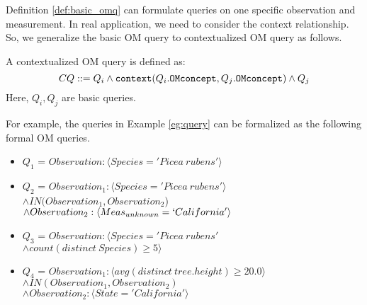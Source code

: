 Definition \ref{def:basic_omq} can formulate queries on
one specific observation and measurement. 
In real application, we need to consider the context relationship. 
So, we generalize the basic OM query to contextualized OM query as
follows. 

\begin{definition}\label{def:context_omq} A
  contextualized OM query is defined as:
\[CQ ::=Q_i \wedge {\tt context}(Q_i.{\tt OMconcept}, Q_j.{\tt
  OMconcept})\wedge Q_j\]
Here, $Q_i, Q_j$ are basic queries.
\end{definition}

For example, the queries in Example \ref{eg:query} can be formalized
as the following formal OM queries. 

\begin{itemize}
\item $Q_1$ = $Observation: \langle Species='Picea~rubens'\rangle$
\item $Q_2$ = $Observation_1: \langle Species='Picea~rubens'\rangle$\\
  $\wedge IN(Observation_1, Observation_2$) \\
$\wedge Observation_2: \langle Meas_{unknown}=`California'\rangle$
\item $Q_3$ = $Observation: \langle Species='Picea~rubens'$\\
$\wedge count(distinct~Species)\geq 5\rangle$
\item $Q_4$ = $Observation_1: \langle avg(distinct~tree.height)\geq 20.0 \rangle$ 
$\wedge IN(Observation_1, Observation_2)$\\
$\wedge Observation_2: \langle State='California'\rangle$\\
\end{itemize}



